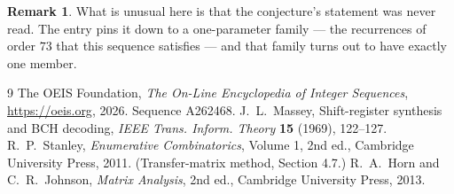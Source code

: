 \documentclass[11pt,a4paper]{article}
\theoremstyle{plain}
\theoremstyle{definition}
\newtheorem{remark}[theorem]{Remark}
\begin{document}
\begin{remark}
What is unusual here is that the conjecture's statement was never read. The entry pins it down
to a one-parameter family --- the recurrences of order $73$ that this sequence satisfies
--- and that family turns out to have exactly one member.
\end{remark}

\begin{thebibliography}{9}
 The OEIS Foundation, \emph{The On-Line Encyclopedia of Integer
Sequences}, \url{https://oeis.org}, 2026. Sequence A262468.
 J.~L.~Massey, Shift-register synthesis and BCH decoding, \emph{IEEE
Trans. Inform. Theory} \textbf{15} (1969), 122--127.
 R.~P.~Stanley, \emph{Enumerative Combinatorics}, Volume 1, 2nd ed.,
Cambridge University Press, 2011. (Transfer-matrix method, Section 4.7.)
 R.~A.~Horn and C.~R.~Johnson, \emph{Matrix Analysis}, 2nd ed., Cambridge
University Press, 2013.
\end{thebibliography}
\end{document}
